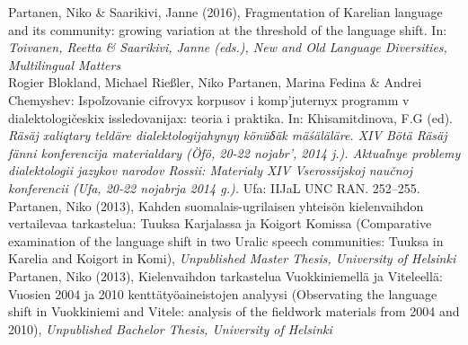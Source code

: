 \documentclass[11pt, a4paper]{article}
\newcommand{\years}[1]{\marginnote{\scriptsize #1}} %
\begin{document}
\years{2016} Partanen, Niko \& Saarikivi, Janne (2016), Fragmentation of Karelian language and its community: growing variation at the threshold of the language shift. In: \emph{Toivanen, Reetta \& Saarikivi, Janne (eds.), New and Old Language Diversities, Multilingual Matters}\\

\years{2014} Rogier Blokland, Michael Rießler, Niko Partanen, Marina Fedina \& Andrei Chemyshev: Ispoľzovanie cifrovyx korpusov i komp’juternyx programm v dialektologičeskix issledovanijax: teoria i praktika. In: Khisamitdinova, F.G (ed). \emph{Räsäj xaliqtary teldäre dialektologijahynyŋ könüδäk mäśäläläre. XIV Bötä Räsäj fänni konferencija materialdary (Öfö, 20-22 nojabr’, 2014 j.). Aktuaľnye problemy dialektologii jazykov narodov Rossii: Materialy XIV Vserossijskoj naučnoj konferencii (Ufa, 20-22 nojabrja 2014 g.).} Ufa: IIJaL UNC RAN. 252–255.\\

\years{2013}Partanen, Niko (2013), Kahden suomalais-ugrilaisen yhteisön kielenvaihdon vertailevaa tarkastelua: Tuuksa Karjalassa ja Koigort Komissa (Comparative examination of the language shift in two Uralic speech communities: Tuuksa in Karelia and Koigort in Komi), \emph{Unpublished Master Thesis, University of Helsinki}\\

\years{2013}Partanen, Niko (2013), Kielenvaihdon tarkastelua Vuokkiniemellä ja Viteleellä: Vuosien 2004 ja 2010 kenttätyöaineistojen analyysi (Observating the language shift in Vuokkiniemi and Vitele: analysis of the fieldwork materials from 2004 and 2010), \emph{Unpublished Bachelor Thesis, University of Helsinki}\\



\end{document}
